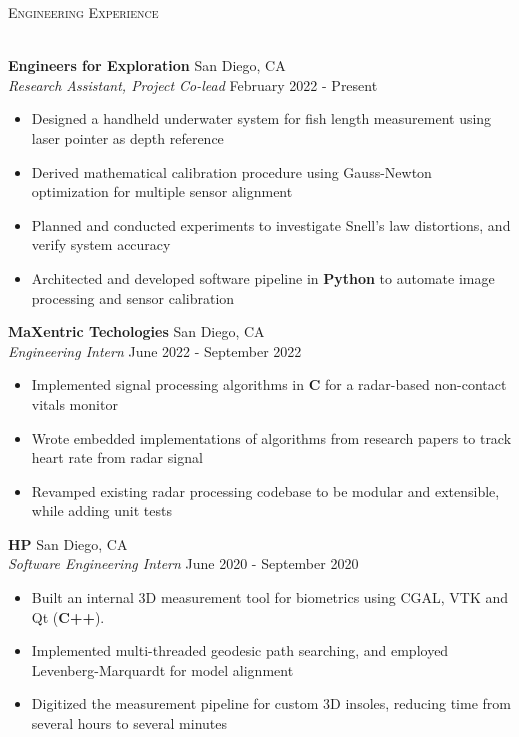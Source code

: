 \documentclass[a4paper]{article}
\newcommand{\lineunder} {
    \vspace*{-8pt} \\
    \hspace*{-18pt} \hrulefill \\
}
\newcommand{\header} [1] {
    {\hspace*{-18pt}\vspace*{6pt} \textsc{#1}}
    \vspace*{-6pt} \lineunder
}
\newenvironment{entry}[4][]{
  \textbf{#2} \hfill #1 \\
  \textit{#3} \hfill #4 \\
  \vspace{-2mm}
  \begin{itemize} \itemsep 0em
  }
  {
  \end{itemize}
}
\begin{document}
\header{Engineering Experience}
\vspace{1mm}


\begin{entry}[San Diego, CA]{Engineers for Exploration}{Research
    Assistant, Project Co-lead}{February 2022 - Present}
	\item Designed a handheld underwater system for fish length measurement using
    laser pointer as depth reference
  \item Derived mathematical calibration procedure using Gauss-Newton optimization
    for multiple sensor alignment
  \item Planned and conducted experiments to investigate Snell's law
    distortions, and verify system accuracy
	\item Architected and developed software pipeline in \textbf{Python} to automate image
    processing and sensor calibration
\end{entry}
\begin{entry}[San Diego, CA]{MaXentric Techologies}{Engineering Intern}{June
    2022 - September 2022}
	\item Implemented signal processing algorithms in \textbf{C} for a radar-based non-contact vitals monitor
	\item Wrote embedded implementations of algorithms from research papers to track heart rate from radar signal
	\item Revamped existing radar processing codebase to be modular and
    extensible, while adding unit tests
\end{entry}

\begin{comment}
  \begin{entry}[San Diego, CA]{Amazon}{Software Development Engineering
      Intern}{June 2021 - September 2021}
  \item Designed and implemented a favorites list widget on the grocery cart page using \textbf{AWS} and \textbf{Spring}
	\item Performed cost/benefit analysis to identify appropriate \textbf{AWS} services (Lambda w/ Dynamo DB Table)
	\item Implemented new endpoints on micro-services used in production code to host front-end
\end{entry}
\end{comment}
\begin{entry}[San Diego, CA]{HP}{Software Engineering Intern}{June 2020 -
    September 2020}
\item Built an internal 3D measurement tool for biometrics using CGAL, VTK and Qt (\textbf{C++}).
\item Implemented multi-threaded geodesic path searching, and employed
  Levenberg-Marquardt for model alignment
\item Digitized the measurement pipeline for custom 3D insoles, reducing time from several hours to several minutes
\end{entry}
\end{document}
